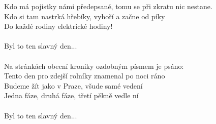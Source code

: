 Kdo má pojistky námi předepsané, tomu se při zkratu nic nestane.\\
Kdo si tam nastrká hřebíky, vyhoří a začne od píky\\
Do každé rodiny elektrické hodiny!\\
\\
Byl to ten slavný den...\\
\\
Na stránkách obecní kroniky ozdobným písmem je psáno:\\
Tento den pro zdejší rolníky znamenal po noci ráno\\
Budeme žít jako v Praze, všude samé vedení\\
Jedna fáze, druhá fáze, třetí pěkně vedle ní\\
\\
Byl to ten slavný den...\\